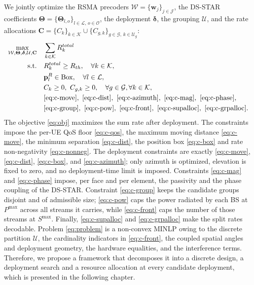 We jointly optimize the RSMA precoders $\mathcal{W} = \{\mathbf{w}_j\}_{j\in\mathcal{J}}$, the DS-STAR coefficients $\boldsymbol{\Theta} = \{\boldsymbol{\Theta}_{l,o}\}_{l\in\mathcal{L},\,o\in\mathcal{O}}$, the deployment $\boldsymbol{\delta}$, the grouping $\mathcal{U}$, and the rate allocations $\mathbf{C} = \{C_k\}_{k\in\mathcal{K}} \cup \{C_{g,k}\}_{g\in\mathcal{G},\,k\in\mathcal{U}_g}$:
\begin{subequations} \label{eq:problem}
\begin{align}
\max_{\mathcal{W}, \boldsymbol{\Theta}, \boldsymbol{\delta}, \mathcal{U}, \mathbf{C}} \quad
& \sum_{k \in \mathcal{K}} R_k^{total} \label{eq:obj} \\
\text{s.t.} \quad
& R_k^{total} \ge R_{th}, \quad \forall k \in \mathcal{K}, \label{eq:c-qos} \\
& \mathbf{p}_l^R \in \mathrm{Box}, \quad \forall l\in\mathcal{L}, \label{eq:c-box}\\
& C_k \ge 0,\ C_{g,k} \ge 0, \quad \forall g \in \mathcal{G}, \forall k \in \mathcal{K}, \label{eq:c-nonneg} \\
& \eqref{eq:c-move},\ \eqref{eq:c-dist},\ \eqref{eq:c-azimuth},\ \eqref{eq:c-mag},\ \eqref{eq:c-phase}, \nonumber\\
& \eqref{eq:c-group},\ \eqref{eq:c-pow},\ \eqref{eq:c-front},\ \eqref{eq:c-supalloc},\ \eqref{eq:c-grpalloc}. \nonumber
\end{align}
\end{subequations}
The objective \eqref{eq:obj} maximizes the sum rate after deployment. The constraints impose the per-UE QoS floor \eqref{eq:c-qos}, the maximum moving distance \eqref{eq:c-move}, the minimum separation \eqref{eq:c-dist}, the position box \eqref{eq:c-box} and rate non-negativity \eqref{eq:c-nonneg}. The deployment constraints are exactly \eqref{eq:c-move}, \eqref{eq:c-dist}, \eqref{eq:c-box}, and \eqref{eq:c-azimuth}; only azimuth is optimized, elevation is fixed to zero, and no deployment-time limit is imposed. Constraints \eqref{eq:c-mag} and \eqref{eq:c-phase} impose, per face and per element, the passivity and the phase coupling of the DS-STAR. Constraint \eqref{eq:c-group} keeps the candidate groups disjoint and of admissible size; \eqref{eq:c-pow} caps the power radiated by each BS at $P^{\max}$ across all streams it carries, while \eqref{eq:c-front} caps the number of those streams at $S^{\max}$. Finally, \eqref{eq:c-supalloc} and \eqref{eq:c-grpalloc} make the split rates decodable. Problem \eqref{eq:problem} is a non-convex MINLP owing to the discrete partition $\mathcal{U}$, the cardinality indicators in \eqref{eq:c-front}, the coupled spatial angles and deployment geometry, the hardware equalities, and the interference terms. Therefore, we propose a framework that decomposes it into a discrete design, a deployment search and a resource allocation at every candidate deployment, which is presented in the following chapter.

